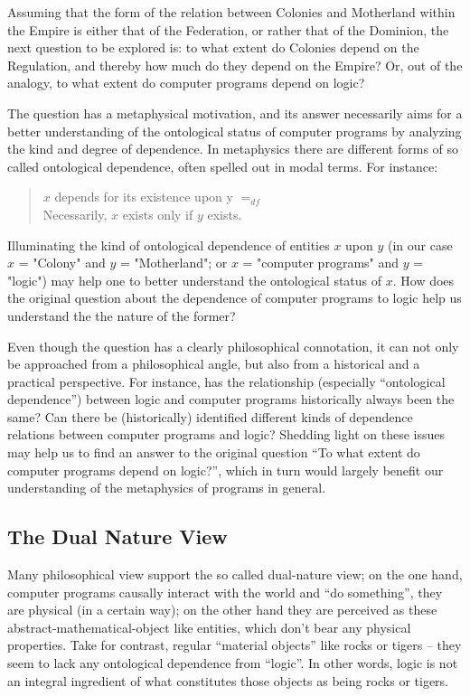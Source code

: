 \documentclass[]{article}
\begin{document}
{\color{red}{this passage is inspired by Nick's note}}

Assuming that the form of the relation between Colonies and Motherland within the Empire is either that of the Federation, or rather that of the Dominion, the next question to be explored is: to what extent do Colonies depend on the Regulation, and thereby how much do they depend on the Empire? Or, out of the analogy, to what extent do computer programs depend on logic?

The question has a metaphysical motivation, and its answer necessarily aims for a better understanding of the ontological status of computer programs by analyzing the kind and degree of dependence. In metaphysics there are different forms of so called ontological dependence, often spelled out in modal terms. For instance:

\begin{quote}
$x$ depends for its existence upon y $=_{df}$\\
Necessarily, $x$ exists only if $y$ exists.
\end{quote}
%
Illuminating the kind of ontological dependence of entities $x$ upon $y$ (in
our case $x$ = "Colony" and $y$ = "Motherland"; or $x$ = "computer programs" and $y$ = "logic") may help one to better understand the ontological status of $x$. How does the original question about the dependence of computer programs to logic help us understand the the nature of the former? 

Even though the question has a clearly philosophical connotation, it can
not only be approached from a philosophical angle, but also from a historical
and a practical perspective. For instance, has the relationship (especially
“ontological dependence”) between logic and computer programs historically
always been the same? Can there be (historically) identified different kinds of
dependence relations between computer programs and logic? Shedding light
on these issues may help us to find an answer to the original question “To
what extent do computer programs depend on logic?”, which in turn would
largely benefit our understanding of the metaphysics of programs in general.


\subsection{The Dual Nature View}

Many philosophical view support the so called dual-nature view; on the one hand, computer programs causally interact with the world and “do something”, they are physical (in a certain way); on the other hand they are perceived as these abstract-mathematical-object like entities, which don't bear any physical properties.
Take for contrast, regular “material objects” like rocks or tigers -- they
seem to lack any ontological dependence from “logic”. In other words, logic is
not an integral ingredient of what constitutes those objects as being rocks or
tigers. 
\end{document}
